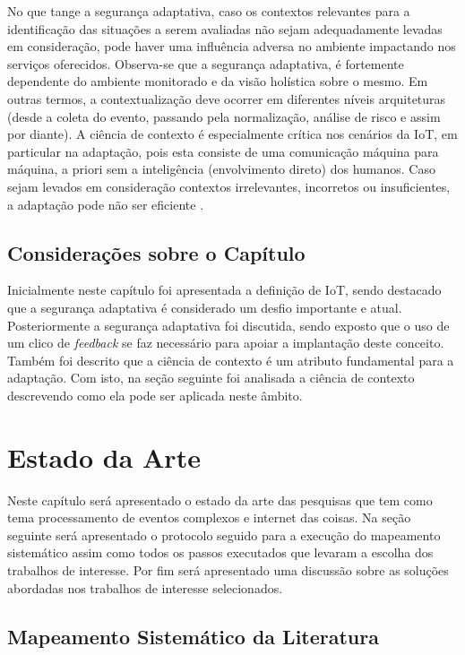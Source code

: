 \documentclass[tid,table]{texufpel} %
\begin{document}
No que tange a segurança adaptativa, caso os contextos relevantes para a identificação das situações a serem avaliadas não sejam adequadamente levadas em consideração, pode haver uma influência adversa no ambiente impactando nos serviços oferecidos. Observa-se que a segurança adaptativa, é fortemente dependente do ambiente monitorado e da visão holística sobre o mesmo. Em outras termos, a contextualização deve ocorrer em diferentes níveis arquiteturas (desde a coleta do evento, passando pela normalização, análise de risco e assim por diante). A ciência de contexto é especialmente crítica nos cenários da IoT, em particular na adaptação, pois esta consiste de uma comunicação máquina para máquina, a priori sem a inteligência (envolvimento direto) dos humanos. Caso sejam levados em consideração contextos irrelevantes, incorretos ou insuficientes, a adaptação pode não ser eficiente \cite{aman15}.



\section{Considerações sobre o Capítulo}

Inicialmente neste capítulo foi apresentada a definição de IoT, sendo destacado que a segurança adaptativa é considerado um desfio importante e atual. Posteriormente a segurança adaptativa foi discutida, sendo exposto que o uso de um clico de \textit{feedback} se faz necessário para apoiar a implantação deste conceito. Também foi descrito que a ciência de contexto é um atributo fundamental para a adaptação. Com isto, na seção seguinte foi analisada a ciência de contexto descrevendo como ela pode ser aplicada neste âmbito.


\chapter{Estado da Arte} 

Neste capítulo será apresentado o estado da arte das pesquisas que tem como tema processamento de eventos complexos e internet das coisas. Na seção seguinte será apresentado o protocolo seguido para a execução do mapeamento sistemático assim como todos os passos executados que levaram a escolha dos trabalhos de interesse. Por fim será apresentado uma discussão sobre as soluções abordadas nos trabalhos de interesse selecionados.    

\section{Mapeamento Sistemático da Literatura}
\end{document}
